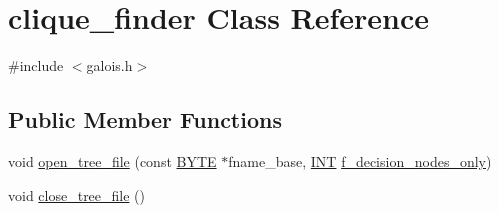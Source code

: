 \hypertarget{classclique__finder}{}\section{clique\+\_\+finder Class Reference}
\label{classclique__finder}


{\ttfamily \#include $<$galois.\+h$>$}

\subsection*{Public Member Functions}
\begin{DoxyCompactItemize}
\item 
void \mbox{\hyperlink{classclique__finder_a1f0e664ae854fb4815b066f254431cfe}{open\+\_\+tree\+\_\+file}} (const \mbox{\hyperlink{galois_8h_ab6cc7b4aeb6ea31aba2b3fbfc83ff5e6}{B\+Y\+TE}} $\ast$fname\+\_\+base, \mbox{\hyperlink{galois_8h_a09fddde158a3a20bd2dcadb609de11dc}{I\+NT}} \mbox{\hyperlink{classclique__finder_ac2e510cfb3aee8de3e2988daa5edf1fe}{f\+\_\+decision\+\_\+nodes\+\_\+only}})
\item 
void \mbox{\hyperlink{classclique__finder_af6a7aae43d6a1a424f9e57786b490c6c}{close\+\_\+tree\+\_\+file}} ()
\item 

\end{DoxyCompactItemize}
